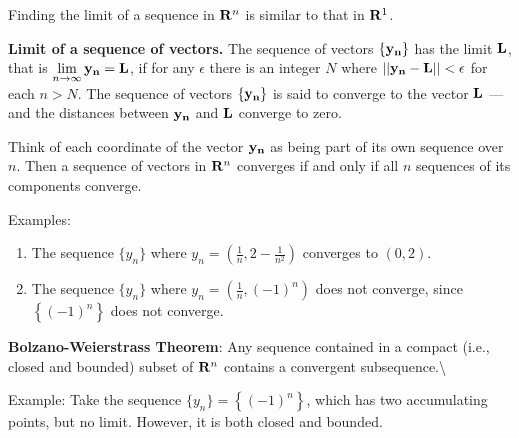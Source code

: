 \documentclass[]{book}
\theoremstyle{definition}
\theoremstyle{definition}
\theoremstyle{definition}
\theoremstyle{remark}
\begin{document}
\begin{comment}
    \parbox{1in}{\,  {\texttt{[image: limit2.eps]}}}
\end{comment}

Finding the limit of a sequence in \({\bf R}^n\) is similar to that in
\({\bf R}^1\).

\textbf{Limit of a sequence of vectors.} The sequence of vectors
\(\bf \{ y_n \}\) has the limit \(\bf L\), that is
\(\lim\limits_{n\to\infty} {\bf y_n}={\bf L}\), if for any \(\epsilon\)
there is an integer \(N\) where \(\bf ||y_n-L||<\epsilon\) for each
\(n>N\). The sequence of vectors \(\bf \{ y_n\}\) is said to converge to
the vector \(\bf L\) --- and the distances between \(\bf y_n\) and
\(\bf L\) converge to zero.

Think of each coordinate of the vector \(\bf y_n\) as being part of its
own sequence over \(n\). Then a sequence of vectors in \({\bf R}^n\)
converges if and only if all \(n\) sequences of its components converge.

Examples:

\begin{enumerate}
        \item The sequence $\{ y_n \}$ where $y_n=\left( \frac{1}{n}, 2-\frac{1}{n^2} \right)$ converges to $(0,2)$.
        \item The sequence $\{ y_n \}$ where $y_n=\left( \frac{1}{n}, (-1)^n \right)$ does not converge, since $\left\{ (-1)^n \right\}$ does not converge.
\end{enumerate}

\textbf{Bolzano-Weierstrass Theorem}: Any sequence contained in a
compact (i.e., closed and bounded) subset of \({\bf R}^n\) contains a
convergent subsequence.\textbackslash{}
\parbox[t]{4in}{Example: Take the sequence $\{ y_n \} =\left\{ (-1)^n \right\}$, which has two accumulating points, but no limit.  However, it is both closed and bounded.}\\

\begin{comment}
        \parbox{1.5in}{\,  {\texttt{[image: bolzwei.eps]}}}\\[12pt]
        \end{comment}

\begin{comment}
        \parbox[t]{4in}{The subsequence of $\{ y_n \}$ defined by taking $n=1,3,5,\ldots$ does have a limit: $-1$.}\parbox{1.5in}{\,  {\texttt{[image: bolzwei1.eps]}}}\\[12pt]

\parbox[t]{4in}{As does the subsequence defined by taking $n=2,4,6,\ldots$, whose limit is $1$.}\parbox{1.5in}{\,  {\texttt{[image: bolzwei2.eps]}}}
\end{comment}
\end{document}
